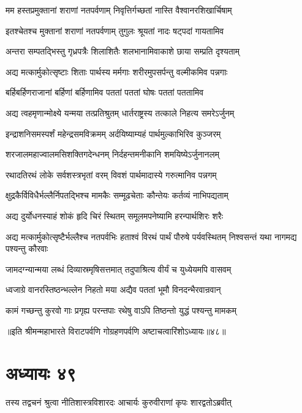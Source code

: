 \twolineshloka
{मम हस्तप्रमुक्तानां शराणां नतपर्वणाम्}
{निवृत्तिर्गच्छतां नास्ति वैश्वानरशिखार्चिषाम्}


\twolineshloka
{इतश्चेतश्च मुक्तानां शराणां नतपर्वणाम्}
{तुगुलः श्रूयतां नादः षट्पदां गायतामिव}


\twolineshloka
{अन्तरा सम्पतद्भिस्तु गृध्रपत्रैः शिलाशितैः}
{शलभानामिवाकाशे छाया सम्प्रति दृश्यताम्}


\twolineshloka
{अद्य मत्कार्मुकोत्सृष्टाः शिताः पार्थस्य मर्मगाः}
{शरीरमुपसर्पन्तु वल्मीकमिव पन्नगाः}


\twolineshloka
{बर्हिबर्हिणराजानां बर्हिणां बर्हिणामिव}
{पततां पततां घोषः पततां पततामिव}


\twolineshloka
{अद्य त्वहमृणान्मोक्ष्ये यन्मया तत्प्रतिश्रुतम्}
{धार्तराष्ट्रस्य तत्काले निहत्य समरेऽर्जुनम्}


\twolineshloka
{इन्द्राशनिसमस्पर्शं महेन्द्रसमविक्रमम्}
{अर्दयिष्याम्यहं पार्थमुल्काभिरिव कुञ्जरम्}


\twolineshloka
{शरजालमहाज्वालमसिशक्तिगदेन्धनम्}
{निर्दहन्तमनीकानि शमयिष्येऽर्जुनानलम्}


\twolineshloka
{रथादतिरथं लोके सर्वशस्त्रभृतां वरम्}
{विवशं पार्थमादास्ये गरुत्मानिव पन्नगम्}


\twolineshloka
{क्षुद्रकैर्विविधैर्भल्लैर्निपतद्भिश्च मामकैः}
{सम्मूढचेताः कौन्तेयः कर्तव्यं नाभिपद्यताम्}


\twolineshloka
{अद्य दुर्योधनस्याहं शोकं हृदि चिरं स्थितम्}
{समूलमपनेष्यामि हरन्पार्थशिरः शरैः}


\threelineshloka
{अद्य मत्कार्मुकोत्सृष्टैर्भल्लैश्च नतपर्वभिः}
{हताश्वं विरथं पार्थं पौरुषे पर्यवस्थितम्}
{निश्वसन्तं यथा नागमद्य पश्यन्तु कौरवाः}


\twolineshloka
{जामदग्न्यान्मया लब्धं दिव्यास्रमृषिसत्तमात्}
{तदुपाश्रित्य वीर्यं च युध्येयमपि वासवम्}


\twolineshloka
{ध्वजाग्रे वानरस्तिष्ठन्भल्लेन निहतो मया}
{अद्यैव पततां भूमौ विनदन्भैरवान्रवान्}


\twolineshloka
{कामं गच्छन्तु कुरवो गाः प्रगृह्य परन्तपाः}
{रथेषु वाऽपि तिष्ठन्तो युद्धं पश्यन्तु मामकम्}

॥इति श्रीमन्महाभारते विराटपर्वणि गोग्रहणपर्वणि अष्टाचत्वारिंशोऽध्यायः॥४८॥

\chapter{अध्यायः ४९}

\twolineshloka
{तस्य तद्वचनं श्रुत्वा नीतिशास्त्रविशारदः}
{आचार्यः कुरुवीराणां कृपः शारद्वतोऽब्रवीत्}


